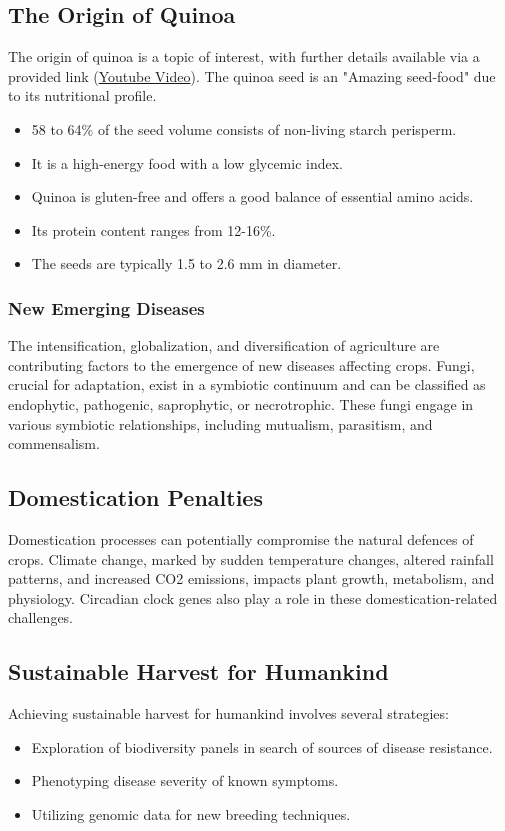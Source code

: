 \subsection{The Origin of Quinoa} 
The origin of quinoa is a topic of interest, with further details available via a provided link (\href{www.youtube.com/watch?v=7dmjOjoog4A}{Youtube Video}). The quinoa seed is an "Amazing seed-food" due to its nutritional profile. 
\begin{itemize} 
    \item 58 to 64\% of the seed volume consists of non-living starch perisperm. 
    \item It is a high-energy food with a low glycemic index. 
    \item Quinoa is gluten-free and offers a good balance of essential amino acids. 
    \item Its protein content ranges from 12-16\%. 
    \item The seeds are typically 1.5 to 2.6 mm in diameter. 
\end{itemize}

\subsubsection{New Emerging Diseases} 
The intensification, globalization, and diversification of agriculture are contributing factors to the emergence of new diseases affecting crops. Fungi, crucial for adaptation, exist in a symbiotic continuum and can be classified as endophytic, pathogenic, saprophytic, or necrotrophic. These fungi engage in various symbiotic relationships, including mutualism, parasitism, and commensalism.

\subsection{Domestication Penalties} 
Domestication processes can potentially compromise the natural defences of crops. Climate change, marked by sudden temperature changes, altered rainfall patterns, and increased CO2 emissions, impacts plant growth, metabolism, and physiology. Circadian clock genes also play a role in these domestication-related challenges.

\subsection{Sustainable Harvest for Humankind} 
Achieving sustainable harvest for humankind involves several strategies: 
\begin{itemize} 
    \item Exploration of biodiversity panels in search of sources of disease resistance. 
    \item Phenotyping disease severity of known symptoms. 
    \item Utilizing genomic data for new breeding techniques. 
\end{itemize}

